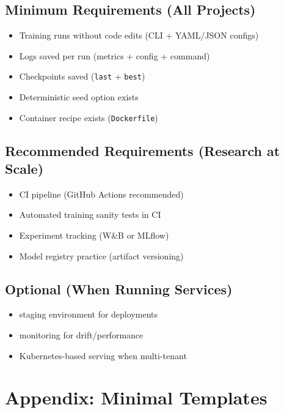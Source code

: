 \documentclass[11pt]{article}
\begin{document}
\subsection{Minimum Requirements (All Projects)}
\begin{itemize}
  \item Training runs without code edits (CLI + YAML/JSON configs)
  \item Logs saved per run (metrics + config + command)
  \item Checkpoints saved (\texttt{last} + \texttt{best})
  \item Deterministic seed option exists
  \item Container recipe exists (\texttt{Dockerfile})
\end{itemize}

\subsection{Recommended Requirements (Research at Scale)}
\begin{itemize}
  \item CI pipeline (GitHub Actions recommended)
  \item Automated training sanity tests in CI
  \item Experiment tracking (W\&B or MLflow)
  \item Model registry practice (artifact versioning)
\end{itemize}

\subsection{Optional (When Running Services)}
\begin{itemize}
  \item staging environment for deployments
  \item monitoring for drift/performance
  \item Kubernetes-based serving when multi-tenant
\end{itemize}

\section{Appendix: Minimal Templates}
\end{document}
